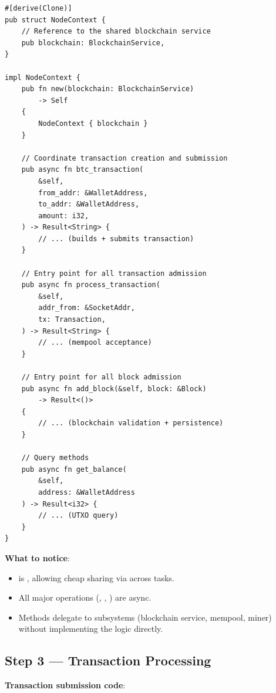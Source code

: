\begin{listing}[htbp]
\caption{NodeContext structure ()}
\label{lst:9-8-2}
\begin{verbatim}
#[derive(Clone)]
pub struct NodeContext {
    // Reference to the shared blockchain service
    pub blockchain: BlockchainService,
}

impl NodeContext {
    pub fn new(blockchain: BlockchainService)
        -> Self
    {
        NodeContext { blockchain }
    }

    // Coordinate transaction creation and submission
    pub async fn btc_transaction(
        &self,
        from_addr: &WalletAddress,
        to_addr: &WalletAddress,
        amount: i32,
    ) -> Result<String> {
        // ... (builds + submits transaction)
    }

    // Entry point for all transaction admission
    pub async fn process_transaction(
        &self,
        addr_from: &SocketAddr,
        tx: Transaction,
    ) -> Result<String> {
        // ... (mempool acceptance)
    }

    // Entry point for all block admission
    pub async fn add_block(&self, block: &Block)
        -> Result<()>
    {
        // ... (blockchain validation + persistence)
    }

    // Query methods
    pub async fn get_balance(
        &self,
        address: &WalletAddress
    ) -> Result<i32> {
        // ... (UTXO query)
    }
}
\end{verbatim}
\end{listing}

\textbf{What to notice}:
\begin{itemize}
  \item {} is , allowing cheap sharing via  across tasks.
  \item All major operations (, , ) are async.
  \item Methods delegate to subsystems (blockchain service, mempool, miner) without implementing the logic directly.
\end{itemize}

\subsection{Step 3 --- Transaction Processing}
\label{sec:ch09-8-step3}

\textbf{Transaction submission code}: 

